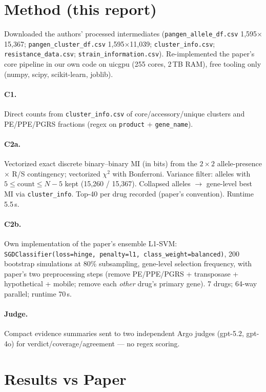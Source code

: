 \documentclass[11pt]{article}
\begin{document}
\section{Method (this report)}
Downloaded the authors' processed intermediates (\texttt{pangen\_allele\_df.csv} 1{,}595$\times$15{,}367; \texttt{pangen\_cluster\_df.csv} 1{,}595$\times$11{,}039; \texttt{cluster\_info.csv}; \texttt{resistance\_data.csv}; \texttt{strain\_information.csv}). Re-implemented the paper's core pipeline in our own code on uicgpu (255 cores, 2\,TB RAM), free tooling only (numpy, scipy, scikit-learn, joblib).

\paragraph{C1.} Direct counts from \texttt{cluster\_info.csv} of core/accessory/unique clusters and PE/PPE/PGRS fractions (regex on \texttt{product} + \texttt{gene\_name}).

\paragraph{C2a.} Vectorized exact discrete binary--binary MI (in bits) from the $2\times2$ allele-presence $\times$ R/S contingency; vectorized $\chi^2$ with Bonferroni. Variance filter: alleles with $5 \le \mathrm{count} \le N-5$ kept (15{,}260 / 15{,}367). Collapsed alleles $\to$ gene-level best MI via \texttt{cluster\_info}. Top-40 per drug recorded (paper's convention). Runtime 5.5\,s.

\paragraph{C2b.} Own implementation of the paper's ensemble L1-SVM: \texttt{SGDClassifier(loss=hinge, penalty=l1, class\_weight=balanced)}, 200 bootstrap simulations at 80\% subsampling, gene-level selection frequency, with paper's two preprocessing steps (remove PE/PPE/PGRS + transposase + hypothetical + mobile; remove each \textit{other} drug's primary gene). 7 drugs; 64-way parallel; runtime 70\,s.

\paragraph{Judge.} Compact evidence summaries sent to two independent Argo judges (gpt-5.2, gpt-4o) for verdict/coverage/agreement --- no regex scoring.

\section{Results vs Paper}
\end{document}
